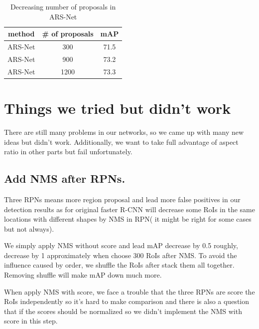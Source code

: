 \documentclass[10pt,twocolumn,letterpaper]{article}
\begin{document}
\begin{table}[ht]
\label{Exp2}
\caption{Decreasing number of proposals in ARS-Net}
\centering
\begin{tabular}{|c|c|c|}
\hline 
 method & \# of proposals & mAP
\\ \hline 
 ARS-Net & 300 & 71.5
\\ \hline 
 ARS-Net & 900 & 73.2
\\ \hline 
 ARS-Net & 1200 & 73.3
\\ \hline
\end{tabular}
\end{table}







\section{Things we tried but didn't work}
There are still many problems in our networks, so we came up with many new ideas but didn't work. Additionally, we want to take full advantage of aspect ratio in other parts but fail unfortunately.
\subsection{Add NMS after RPNs.}
\par
Three RPNs means more region proposal and lead more false positives in our detection results as for original faster R-CNN will decrease some RoIs in the same locations with different shapes by NMS in RPN( it might be right for some cases but not always).

\par
We simply apply NMS without score and lead mAP decrease by 0.5 roughly, decrease by 1 approximately when choose 300 RoIs after NMS. To avoid the influence caused by order, we shuffle the RoIs after stack them all together. Removing shuffle will make mAP down much more.

\par
When apply NMS with score, we face a trouble that the three RPNs are score the RoIs independently so it’s hard to make comparison and there is also a question that if the scores should be normalized so we didn’t implement the NMS with score in this step.
\end{document}
